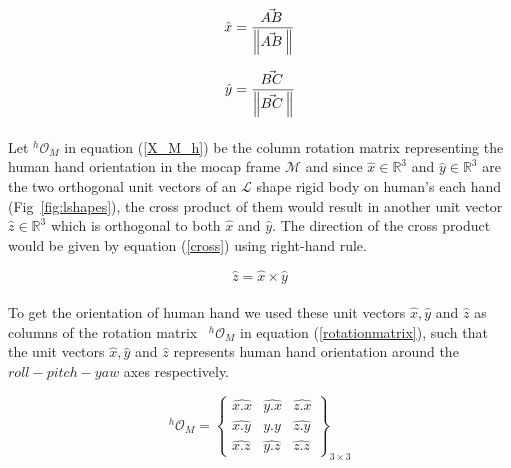 \documentclass[a4paper, 12pt, oneside]{Thesis}  %
\begin{document}
\begin{equation*}
\hat{x} = \frac{\vec{AB}^{\,}}{\norm{\vec{AB}^{\,}}}
\end{equation*}

\begin{equation*}
\hat{y} = \frac{\vec{BC}^{\,}}{\norm{\vec{BC}^{\,}}}
\end{equation*}

\paragraph*{}
Let ${}^{h}\mathcal{O}_{M}$ in equation (\ref{X_M_h}) be the column rotation matrix representing the human hand orientation in the mocap frame $\mathcal{M}$ and since $\hat{x} \in \mathbb{R}^{3}$ and $\hat{y} \in \mathbb{R}^{3}$ are the two orthogonal unit vectors of an $\mathcal{L}$ shape rigid body on human's each hand (Fig~\ref{fig:lshapes}), the cross product of them would result in another unit vector $\hat{z} \in \mathbb{R}^{3}$ which is orthogonal to both $\hat{x}$ and $\hat{y}$. The direction of the cross product would be given by equation (\ref{cross}) using right-hand rule.


\begin{equation}\label{cross}
\hat{z} = \hat{x} \times \hat{y}
\end{equation}


\paragraph*{}
To get the orientation of human hand we used these unit vectors $\hat{x}, \hat{y}$ and $\hat{z}$ as columns of the rotation matrix~\cite{evans2001rotations, altmann2005rotations, jia2017rotation} ${}^{h}\mathcal{O}_{M}$ in equation (\ref{rotationmatrix}), such that the unit vectors $\hat{x}, \hat{y}$ and $\hat{z}$ represents human hand orientation around the $roll-pitch-yaw$ axes respectively.

\begin{equation}\label{rotationmatrix}
{}^{h}\mathcal{O}_{M} = 
\left\{\begin{array}{cccc}
\hat{x.x} & \hat{y.x} & \hat{z.x} \\
\hat{x.y} & \hat{y.y} & \hat{z.y} \\
\hat{x.z} & \hat{y.z} & \hat{z.z}
\end{array}\right\}_{3\times 3}
\end{equation}
\end{document}
